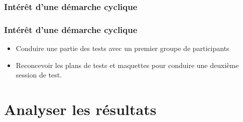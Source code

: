 \subsubsection{Intérêt d'une démarche cyclique} 
		
		\begin{frame}[allowframebreaks]
		\frametitle{Intérêt d'une démarche cyclique}
					\begin {itemize}
				      \item Conduire une partie des tests avec un premier groupe de participants
				      \item Reconcevoir les plans de tests et maquettes pour conduire une deuxième session de test. 
				   	\end{itemize}	
		\end{frame}     	 
	
	
\section{Analyser les résultats} 
